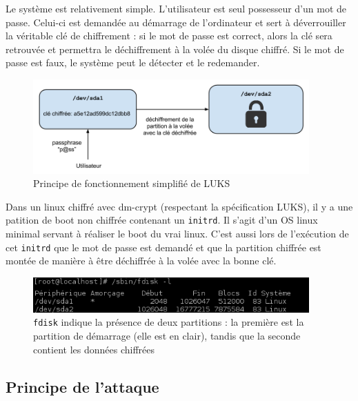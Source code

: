 \documentclass[12pt,a4paper]{article}
\begin{document}
Le système est relativement simple. L'utilisateur est seul possesseur d'un mot de passe. Celui-ci est demandée au démarrage de l'ordinateur et sert à déverrouiller la véritable clé de chiffrement : si le mot de passe est correct, alors la clé sera retrouvée et permettra le déchiffrement à la volée du disque chiffré. Si le mot de passe est faux, le système peut le détecter et le redemander.

\begin{figure}[H]
	\centering
        
	\includegraphics[width=400px]{img/luks_principe.png}
	\caption{Principe de fonctionnement simplifié de LUKS}
\end{figure}

Dans un linux chiffré avec dm-crypt (respectant la spécification LUKS), il y a une patition de boot non chiffrée contenant un \texttt{initrd}. Il s'agit d'un OS linux minimal servant à réaliser le boot du vrai linux. C'est aussi lors de l'exécution de cet \texttt{initrd} que le mot de passe est demandé et que la partition chiffrée est montée de manière à être déchiffrée à la volée avec la bonne clé.

\begin{figure}[H]
	\centering
	\includegraphics[width=400px]{img/luks_fdisk.png}
	\caption{\texttt{fdisk} indique la présence de deux partitions : la première est la partition de démarrage (elle est en clair), tandis que la seconde contient les données chiffrées}
\end{figure}

\subsection{Principe de l'attaque}
\end{document}

